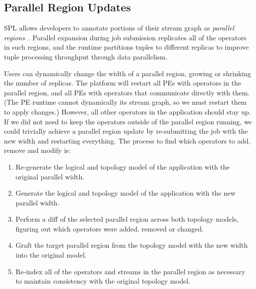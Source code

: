 %

\subsection{Parallel Region Updates}
\label{sec:parupdates}

SPL allows developers to annotate portions of their stream graph as
\emph{parallel regions}~\cite{spl_parallel}. Parallel expansion during job
submission replicates all of the operators in such regions, and the
runtime partitions tuples to different replicas to improve tuple processing
throughput through data parallelism.

Users can dynamically change the width of a parallel region, growing or
shrinking the number of replicas. The platform will restart all PEs with
operators in the parallel region, and all PEs with operators that communicate
directly with them. (The PE runtime cannot dynamically its stream graph, so we
must restart them to apply changes.) However, all other operators in the
application should stay up. If we did not need to keep the operators outside of
the parallel region running, we could trivially achieve a parallel region
update by re-submitting the job with the new width and restarting everything.
The process to find which operators to add, remove and modify is:

\begin{enumerate}
    \item Re-generate the logical and topology model of the application with the 
        original parallel width.
    \item Generate the logical and topology model of the application with the 
        new parallel width.
    \item Perform a diff of the selected parallel region across both topology models, 
        figuring out which operators were added, removed or changed.
    \item Graft the target parallel region from the topology model with the new width
        into the original model.
    \item Re-index all of the operators and streams in the parallel region as 
        necessary to maintain consistency with the original topology model.
\end{enumerate}

